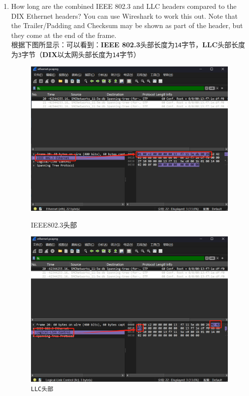 \documentclass{article}
\begin{document}
	\begin{enumerate}[noitemsep, label={{\arabic*})}]
		\item How long are the combined IEEE 802.3 and LLC headers compared to the DIX Ethernet headers? You can use Wireshark to work this out. Note that the Trailer/Padding and Checksum may be shown as part of the header, but they come at the end of the frame.\\
		
		根据下图所显示：可以看到：\textbf{IEEE 802.3}头部长度为\texttt{14}字节，\textbf{LLC}头部长度为\texttt{3}字节（\textbf{DIX}以太网头部长度为\texttt{14}字节）
		
		\begin{figure}[H]
			\centering
			\begin{minipage}[b]{0.45\textwidth}
				\includegraphics[width=\textwidth]{images/21.IEEE802.3头部.png}
				\caption{IEEE802.3头部}
			\end{minipage}
			\hfill
			\begin{minipage}[b]{0.45\textwidth}
				\includegraphics[width=\textwidth]{images/22.LLC头部.png}
				\caption{\texttt{LLC头部}}
			\end{minipage}
		\end{figure}
		

\end{enumerate}
\end{document}
